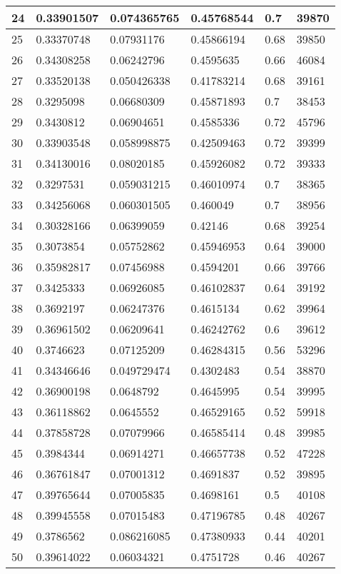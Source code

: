 \begin{longtable}{|l|l|l|l|l|l|}
24 & 0.33901507 & 0.074365765 & 0.45768544 & 0.7 & 39870 \\ \hline 
25 & 0.33370748 & 0.07931176 & 0.45866194 & 0.68 & 39850 \\ \hline 
26 & 0.34308258 & 0.06242796 & 0.4595635 & 0.66 & 46084 \\ \hline 
27 & 0.33520138 & 0.050426338 & 0.41783214 & 0.68 & 39161 \\ \hline 
28 & 0.3295098 & 0.06680309 & 0.45871893 & 0.7 & 38453 \\ \hline 
29 & 0.3430812 & 0.06904651 & 0.4585336 & 0.72 & 45796 \\ \hline 
30 & 0.33903548 & 0.058998875 & 0.42509463 & 0.72 & 39399 \\ \hline 
31 & 0.34130016 & 0.08020185 & 0.45926082 & 0.72 & 39333 \\ \hline 
32 & 0.3297531 & 0.059031215 & 0.46010974 & 0.7 & 38365 \\ \hline 
33 & 0.34256068 & 0.060301505 & 0.460049 & 0.7 & 38956 \\ \hline 
34 & 0.30328166 & 0.06399059 & 0.42146 & 0.68 & 39254 \\ \hline 
35 & 0.3073854 & 0.05752862 & 0.45946953 & 0.64 & 39000 \\ \hline 
36 & 0.35982817 & 0.07456988 & 0.4594201 & 0.66 & 39766 \\ \hline 
37 & 0.3425333 & 0.06926085 & 0.46102837 & 0.64 & 39192 \\ \hline 
38 & 0.3692197 & 0.06247376 & 0.4615134 & 0.62 & 39964 \\ \hline 
39 & 0.36961502 & 0.06209641 & 0.46242762 & 0.6 & 39612 \\ \hline 
40 & 0.3746623 & 0.07125209 & 0.46284315 & 0.56 & 53296 \\ \hline 
41 & 0.34346646 & 0.049729474 & 0.4302483 & 0.54 & 38870 \\ \hline 
42 & 0.36900198 & 0.0648792 & 0.4645995 & 0.54 & 39995 \\ \hline 
43 & 0.36118862 & 0.0645552 & 0.46529165 & 0.52 & 59918 \\ \hline 
44 & 0.37858728 & 0.07079966 & 0.46585414 & 0.48 & 39985 \\ \hline 
45 & 0.3984344 & 0.06914271 & 0.46657738 & 0.52 & 47228 \\ \hline 
46 & 0.36761847 & 0.07001312 & 0.4691837 & 0.52 & 39895 \\ \hline 
47 & 0.39765644 & 0.07005835 & 0.4698161 & 0.5 & 40108 \\ \hline 
48 & 0.39945558 & 0.07015483 & 0.47196785 & 0.48 & 40267 \\ \hline 
49 & 0.3786562 & 0.086216085 & 0.47380933 & 0.44 & 40201 \\ \hline 
50 & 0.39614022 & 0.06034321 & 0.4751728 & 0.46 & 40267 \\ \hline 
\end{longtable}